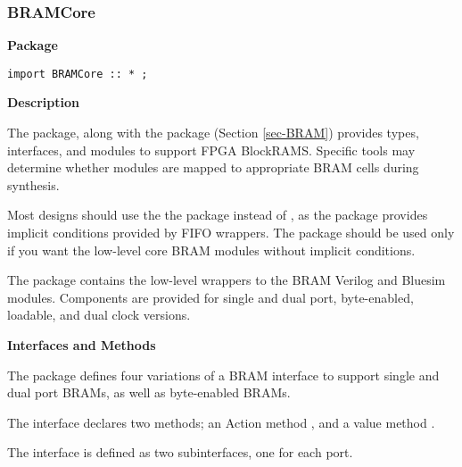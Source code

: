 \subsubsection{BRAMCore}
\label{sec-BRAMCore}


{\bf Package}

\begin{verbatim}
import BRAMCore :: * ;
\end{verbatim}



{\bf Description}

The  package, along with the  package (Section
\ref{sec-BRAM}) provides types, interfaces, and modules to support
FPGA BlockRAMS.  Specific tools may determine whether modules are
mapped to  appropriate BRAM cells during synthesis.

Most designs should use the  the  package instead of
, as the  package provides implicit conditions
provided by  FIFO wrappers.
The  package should be used only if you want the
low-level core BRAM modules without  implicit conditions.

The   package contains the low-level wrappers to the BRAM
Verilog and Bluesim modules.  Components are provided for   single and
dual port,  byte-enabled,  loadable, and dual clock versions.



{\bf Interfaces and Methods}


The  package defines four  variations of a BRAM 
interface to support  single
and dual port BRAMs, as well as byte-enabled BRAMs.

The  interface declares two methods; an Action method
, and a value method .

The  interface is defined as two 
subinterfaces, one for each port.

